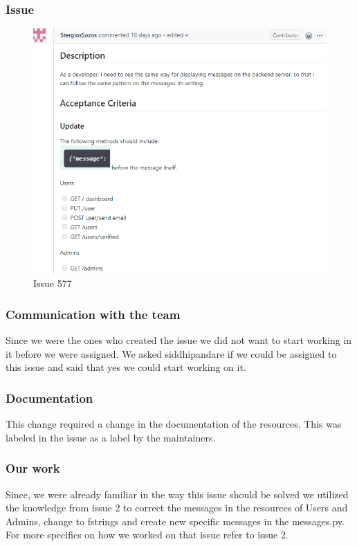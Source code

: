 \documentclass{article}
\begin{document}
\subsubsection{Issue}
\begin{figure}[tph!]
\centerline{\includegraphics[totalheight=10cm, width=15cm]{issue577.png}}
    \caption{Issue 577}
    \label{fig:verticalcell}
\end{figure}
\vfill
\clearpage

\subsubsection{Communication with the team}
Since we were the ones who created the issue we did not want to start working in it before we were assigned. We asked siddhipandare if we could be assigned to this  issue and said that yes we could start working on it.

\subsubsection{Documentation}
This change required a change in the documentation of the resources. This was labeled in the issue as a label by the maintainers. 

\subsubsection{Our work}
Since, we were already familiar in the way this issue should be solved we utilized the knowledge from issue 2 to correct the messages in the resources of Users and Admins, change to fstrings and create new specific messages in the messages.py. For more specifics on how we worked on that issue refer to issue 2.
\end{document}
